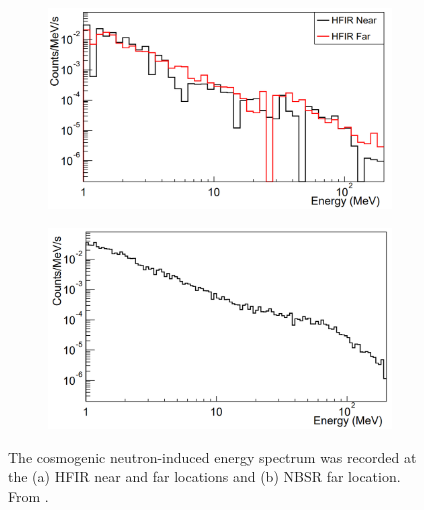 \begin{figure}[!h]
\centering
\begin{subfigure}{.5\textwidth}
  \centering
  \includegraphics[width=\linewidth]{Chapter2/Figs/Raster/Prospect_HFIR_nearFarPlot.png}
  \captionsetup{width=.9\linewidth}
  \caption{}
  \label{subFig:Prospect_HFIR_nearFarPlot}
\end{subfigure}%
\begin{subfigure}{.5\textwidth}
  \centering
\includegraphics[width=\linewidth]{Chapter2/Figs/Raster/Prospect_NBSR_farPlot.png}
  \captionsetup{width=.9\linewidth}
  \caption{}
  \label{subFig:Prospect_NBSR_farPlot}
\end{subfigure}
\caption[The cosmogenic neutron-induced energy spectrum at HFIR and NBSR.]{The cosmogenic neutron-induced energy spectrum was recorded at the (a) HFIR near and far locations and (b) NBSR far location. From \cite{Ashenfelter_2016}.}
\label{fig:Prospect_HFIR_NBSR_nearFarPlots}
\end{figure}

